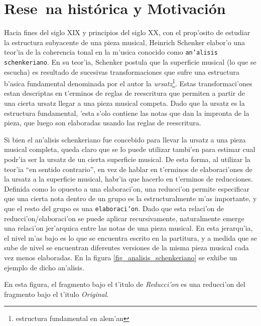 \section{Rese~na hist\'orica y Motivaci\'on}
Hacia fines del siglo XIX y principios del siglo XX, con el prop'osito de estudiar la estructura subyacente de una pieza musical, 
Heinrich Schenker elabor'o una teor'ia de la coherencia tonal en la m'usica conocido como \texttt{an'alisis schenkeriano}.
En su teor'ia, Schenker postula que la superficie musical (lo que se escucha) es resultado de sucesivas transformaciones que sufre una estructura b'asica fundamental 
denominada por el autor la \emph{ursatz}\footnote{estructura fundamental en alem'an}. Estas transformaci'ones estan descriptas en t'erminos de reglas de reescritura que permiten 
a partir de una cierta ursatz llegar a una pieza musical competa. Dado que la ursatz es la estructura fundamental, 'esta s'olo contiene las notas que dan la impronta de la pieza, 
que luego son elaboradas usando las reglas de reescritura.

Si bien el an'alisis schenkeriano fue concebido para llevar la ursatz a una pieza musical completa, queda claro que se lo puede utilizar tambi'en para estimar
cual podr'ia ser la ursatz de un cierta superficie musical. De esta forma, al utilizar la teor'ia ``en sentido contrario'', en vez de hablar en t'erminos de elaboraci'ones de 
la ursatz a la superficie musical, habr'ia que hacerlo en t'erminos de reducciones. Definida como lo opuesto a una elaboraci'on, una reducci'on permite especificar que una cierta 
nota dentro de un grupo es la estructuralmente m'as importante, y que el resto del grupo es una \texttt{elaboraci'on}. 
Dado que esta relaci'on de reducci'on/elaboraci'on se puede aplicar recursivamente, naturalmente emerge una relaci'on 
jer'arquica entre las notas de una pieza musical.  En esta jerarqu'ia, el nivel m'as bajo es lo que se encuentra escrito en la partitura, y a medida que se sube de nivel se 
encuentran diferentes versiones de la misma pieza musical cada vez menos elaboradas. En la figura \ref{fig_analisis_schenkeriano} se exhibe un ejemplo de dicho an'alisis.


\begin{imagen}
\end{imagen}


En esta figura, el fragmento bajo el t'itulo de \emph{Reducci'on} es una reducci'on del fragmento bajo el t'itulo \emph{Original}.

